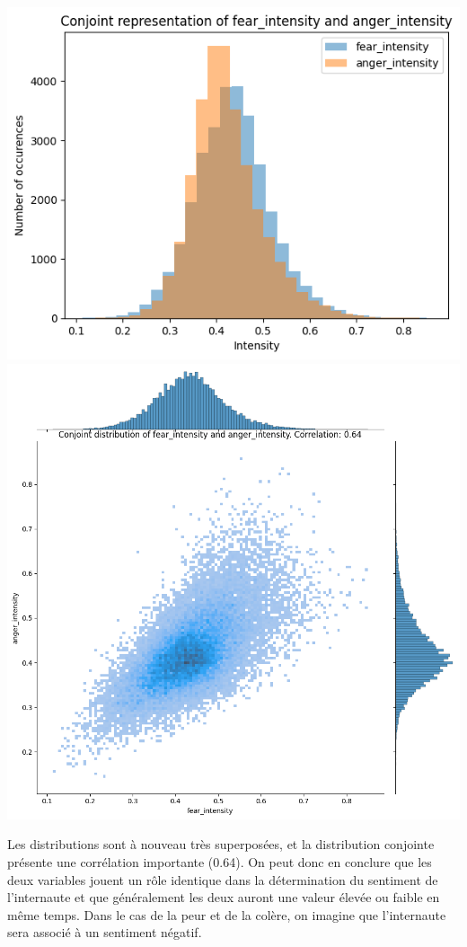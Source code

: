\documentclass{article}
\begin{document}
\begin{center}
    \includegraphics[scale=0.39]{./img/conjoint_representation_fear_intensity_anger_intensity.png}
    \includegraphics[scale=0.23]{./img/conjoint_distribution_fear_intensity_anger_intensity.png}
\end{center}

Les distributions sont à nouveau très superposées, et la distribution conjointe
présente une corrélation importante (0.64). On peut donc en conclure que les deux variables
jouent un rôle identique dans la détermination du sentiment de l'internaute et que
généralement les deux auront une valeur élevée ou faible en même temps. Dans le cas de
la peur et de la colère, on imagine que l'internaute sera associé à un sentiment négatif.
\end{document}
